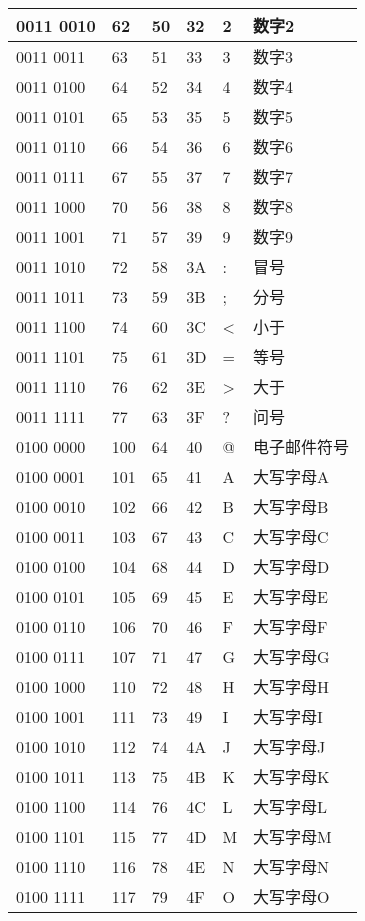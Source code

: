 \begin{longtable}{| p{.10\linewidth} | p{.08\linewidth} | p{.08\linewidth} | p{.10\linewidth} | p{.28\linewidth} | p{.15\linewidth} |}
0011 0010 & 62 & 50 & 32 & 2 & 数字2 \\ \hline
0011 0011 & 63 & 51 & 33 & 3 & 数字3 \\ \hline
0011 0100 & 64 & 52 & 34 & 4 & 数字4 \\ \hline
0011 0101 & 65 & 53 & 35 & 5 & 数字5 \\ \hline
0011 0110 & 66 & 54 & 36 & 6 & 数字6 \\ \hline
0011 0111 & 67 & 55 & 37 & 7 & 数字7 \\ \hline
0011 1000 & 70 & 56 & 38 & 8 & 数字8 \\ \hline
0011 1001 & 71 & 57 & 39 & 9 & 数字9 \\ \hline
0011 1010 & 72 & 58 & 3A & : & 冒号 \\ \hline
0011 1011 & 73 & 59 & 3B & ; & 分号 \\ \hline
0011 1100 & 74 & 60 & 3C & < & 小于 \\ \hline
0011 1101 & 75 & 61 & 3D & = & 等号 \\ \hline
0011 1110 & 76 & 62 & 3E & > & 大于 \\ \hline
0011 1111 & 77 & 63 & 3F & ? & 问号 \\ \hline
0100 0000 & 100 & 64 & 40 & @ & 电子邮件符号 \\ \hline
0100 0001 & 101 & 65 & 41 & A & 大写字母A \\ \hline
0100 0010 & 102 & 66 & 42 & B & 大写字母B \\ \hline
0100 0011 & 103 & 67 & 43 & C & 大写字母C \\ \hline
0100 0100 & 104 & 68 & 44 & D & 大写字母D \\ \hline
0100 0101 & 105 & 69 & 45 & E & 大写字母E \\ \hline
0100 0110 & 106 & 70 & 46 & F & 大写字母F \\ \hline
0100 0111 & 107 & 71 & 47 & G & 大写字母G \\ \hline
0100 1000 & 110 & 72 & 48 & H & 大写字母H \\ \hline
0100 1001 & 111 & 73 & 49 & I & 大写字母I \\ \hline
0100 1010 & 112 & 74 & 4A & J & 大写字母J \\ \hline
0100 1011 & 113 & 75 & 4B & K & 大写字母K \\ \hline
0100 1100 & 114 & 76 & 4C & L & 大写字母L \\ \hline
0100 1101 & 115 & 77 & 4D & M & 大写字母M \\ \hline
0100 1110 & 116 & 78 & 4E & N & 大写字母N \\ \hline
0100 1111 & 117 & 79 & 4F & O & 大写字母O \\ \hline

\end{longtable}

